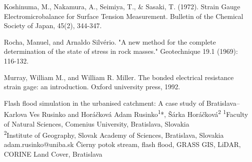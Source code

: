 {Koshinuma, M., Nakamura, A., Seimiya, T., \& Sasaki, T. (1972). Strain Gauge Electromicrobalance for Surface Tension Measurement. Bulletin of the Chemical Society of Japan, 45(2), 344-347.
	
Rocha, Manuel, and Arnaldo Silvério. "A new method for the complete determination of the state of stress in rock masses." Geotechnique 19.1 (1969): 116-132.

Murray, William M., and William R. Miller. The bonded electrical resistance strain gage: an introduction. Oxford university press, 1992.
}

\abstract
{Flash flood simulation in the urbanised catchment: A case study of Bratislava–Karlova Ves} %
{Rusinko and Horáčková} %
{Adam Rusinko\textsuperscript{1}*, Šárka Horáčková\textsuperscript{2}} %
{\POtag} %
{
	\textsuperscript{1}Faculty of Natural Sciences, Comenius University, Bratislava, Slovakia\\
	\textsuperscript{2}Institute of Geography, Slovak Academy of Sciences, Bratislava, Slovakia
} %
{adam.rusinko@uniba.sk}  %
{Čierny potok stream, flash flood, GRASS GIS, LiDAR, CORINE Land Cover, Bratislava}%
